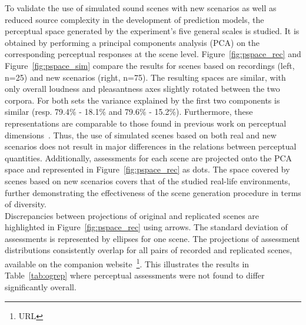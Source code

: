 \documentclass[11pt,a4paper]{article}
\begin{document}
To validate the use of simulated sound scenes with new scenarios as well as reduced source complexity in the development of prediction models, the perceptual space generated by the experiment's five general scales is studied. It is obtained by performing a principal components analysis (PCA) on the corresponding perceptual responses at the scene level. Figure~\ref{fig:pspace_rec} and Figure~\ref{fig:pspace_sim} compare the results for scenes based on recordings (left, n=25) and new scenarios (right, n=75). The resulting spaces are similar, with only overall loudness and pleasantness axes slightly rotated between the two corpora. For both sets the variance explained by the first two components is similar (resp. 79.4\% - 18.1\% and 79.6\% - 15.2\%). Furthermore, these representations are comparable to those found in previous work on perceptual dimensions~\cite{axelsson2010, cain2013}. Thus, the use of simulated scenes based on both real and new scenarios does not result in major differences in the relations between perceptual quantities. Additionally, assessments for each scene are projected onto the PCA space and represented in Figure~\ref{fig:pspace_rec} as dots. The space covered by scenes based on new scenarios covers that of the studied real-life environments, further demonstrating the effectiveness of the scene generation procedure in terms of diversity.\\

Discrepancies between projections of original and replicated scenes are highlighted in Figure~\ref{fig:pspace_rec} using arrows. The standard deviation of assessments is represented by ellipses for one scene. The projections of assessment distributions consistently overlap for all pairs of recorded and replicated scenes, available on the companion website~\footnote{URL}. This illustrates the results in Table~\ref{tab:ogrep} where perceptual assessments were not found to differ significantly overall.\\
\end{document}
